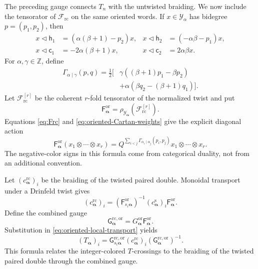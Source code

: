 \documentclass[11pt,a4paper]{article}
\newcommand{\ot}{\otimes}
\newcommand{\tri}{\mathbin{\triangleleft}}
\newcommand{\rc}{\mathrm{rc}}
\theoremstyle{definition}
\theoremstyle{remark}
\begin{document}
The preceding gauge connects \(T_n\) with the untwisted braiding.  We now
include the tensorator of \(\mathcal F_{\rc}\) on the same oriented words.
If \(x\in \mathcal Y_\alpha\) has bidegree \(p=(p_1,p_2)\), then
\begin{equation}\label{eq:oriented-Cartan-weights}
\begin{aligned}
 x\tri\mathsf h_1
 &=(\alpha(\beta+1)-p_2)x,&
 x\tri\mathsf h_2
 &=(-\alpha\beta-p_1)x,\\
 x\tri\mathsf c_1
 &=-2\alpha(\beta+1)x,&
 x\tri\mathsf c_2
 &=2\alpha\beta x.
\end{aligned}
\end{equation}
For \(\alpha,\gamma\in\mathbb Z\), define
\begin{equation}\label{eq:oriented-F-exponent}
\begin{aligned}
\Gamma_{\alpha\mid\gamma}(p,q)
=\frac12\bigl[
&\gamma((\beta+1)p_1-\beta p_2)\\
&+\alpha(\beta q_2-(\beta+1)q_1)
\bigr].
\end{aligned}
\end{equation}
Let \(\mathcal F_{\rc}^{[r]}\) be the coherent \(r\)-fold tensorator of
the normalized twist and put
\begin{equation}\label{eq:oriented-F-tensorator}
 \mathsf F_{\boldsymbol\alpha}^{\mathrm{or}}
 =
 \rho_{\mathcal Y_{\boldsymbol\alpha}}(\mathcal F_{\rc}^{[r]}).
\end{equation}
Equations \eqref{eq:Frc} and \eqref{eq:oriented-Cartan-weights} give the
explicit diagonal action
\begin{equation}\label{eq:oriented-F-action}
\mathsf F_{\boldsymbol\alpha}^{\mathrm{or}}
(x_1\ot\cdots\ot x_r)
=
Q^{\sum_{i<j}
\Gamma_{\alpha_i\mid\alpha_j}(p_i,p_j)}
x_1\ot\cdots\ot x_r.
\end{equation}
The negative-color signs in this formula come from categorical duality,
not from an additional convention.

Let \((c_{\boldsymbol\alpha}^{\rc})_i\) be the braiding of the twisted
paired double.  Monoidal transport under a Drinfeld twist gives
\begin{equation}\label{eq:oriented-twisted-braiding}
 (c_{\boldsymbol\alpha}^{\rc})_i
 =
 (\mathsf F_{s_i\boldsymbol\alpha}^{\mathrm{or}})^{-1}
 (c_{\boldsymbol\alpha}^{\mathrm s})_i
 \mathsf F_{\boldsymbol\alpha}^{\mathrm{or}}.
\end{equation}
Define the combined gauge
\begin{equation}\label{eq:combined-oriented-gauge}
 \mathsf G_{\boldsymbol\alpha}^{\rc,\mathrm{or}}
 =
 G_{\boldsymbol\alpha}^{\mathrm{or}}
 \mathsf F_{\boldsymbol\alpha}^{\mathrm{or}}.
\end{equation}
Substitution in \eqref{eq:oriented-local-transport} yields
\begin{equation}\label{eq:oriented-combined-transport}
 (T_{\boldsymbol\alpha})_i
 =
 \mathsf G_{s_i\boldsymbol\alpha}^{\rc,\mathrm{or}}
 (c_{\boldsymbol\alpha}^{\rc})_i
 (\mathsf G_{\boldsymbol\alpha}^{\rc,\mathrm{or}})^{-1}.
\end{equation}
This formula relates the integer-colored \(T\)-crossings to the
braiding of the twisted paired double through the combined gauge.
\end{document}
